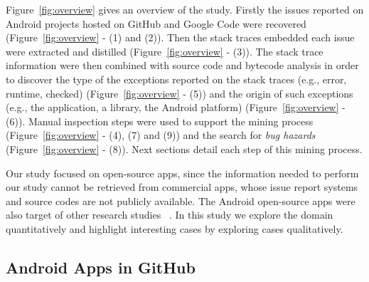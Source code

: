 \documentclass[conference]{IEEEtran}
\begin{document}
Figure~\ref{fig:overview} gives an overview of the study.
Firstly  the issues reported on Android projects hosted on GitHub and Google Code were recovered (Figure~\ref{fig:overview} - (1) and (2)).
Then the stack traces embedded each issue were extracted and distilled (Figure~\ref{fig:overview} - (3)).
The stack trace information were then combined with source code and bytecode analysis in order to discover 
the type of the exceptions reported on the stack traces (e.g., error, runtime, checked)  (Figure~\ref{fig:overview} - (5))  and the origin of such exceptions 
(e.g., the application, a library, the Android platform)  (Figure~\ref{fig:overview} - (6)). 
Manual inspection steps were used to support the mining process (Figure~\ref{fig:overview} - (4), (7) and (9)) and 
the search for \emph{bug hazards}  (Figure~\ref{fig:overview} - (8)). Next sections detail each step of this mining process.

Our study focused on open-source apps, since the information needed to perform our study
cannot be retrieved from commercial apps, whose issue report systems and 
source codes are not publicly available. The Android open-source apps were also 
target of other research studies ~\cite{Linar13,ahimed}.   
In this study we explore the domain quantitatively and highlight interesting cases by 
exploring cases qualitatively. 




\subsection{Android Apps in GitHub}
\label{sec:git}
\end{document}
